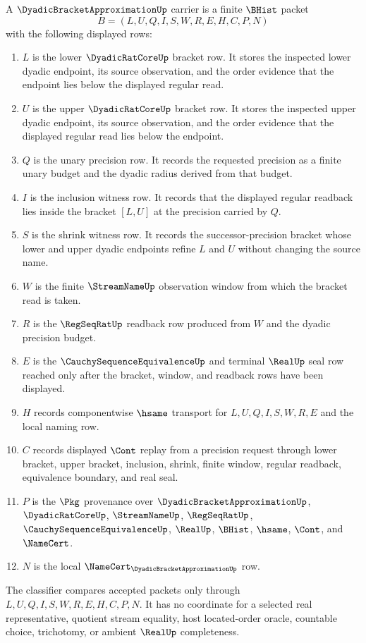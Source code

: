 \begin{definition}
\label{def:dyadic-bracket-approximation-carrier}
A $\DyadicBracketApproximationUp$ carrier is a finite $\BHist$ packet
$$
B=(L,U,Q,I,S,W,R,E,H,C,P,N)
$$
with the following displayed rows:
\begin{enumerate}
\item $L$ is the lower $\DyadicRatCoreUp$ bracket row. It stores the inspected lower dyadic endpoint, its source observation, and the order evidence that the endpoint lies below the displayed regular read.
\item $U$ is the upper $\DyadicRatCoreUp$ bracket row. It stores the inspected upper dyadic endpoint, its source observation, and the order evidence that the displayed regular read lies below the endpoint.
\item $Q$ is the unary precision row. It records the requested precision as a finite unary budget and the dyadic radius derived from that budget.
\item $I$ is the inclusion witness row. It records that the displayed regular readback lies inside the bracket $[L,U]$ at the precision carried by $Q$.
\item $S$ is the shrink witness row. It records the successor-precision bracket whose lower and upper dyadic endpoints refine $L$ and $U$ without changing the source name.
\item $W$ is the finite $\StreamNameUp$ observation window from which the bracket read is taken.
\item $R$ is the $\RegSeqRatUp$ readback row produced from $W$ and the dyadic precision budget.
\item $E$ is the $\CauchySequenceEquivalenceUp$ and terminal $\RealUp$ seal row reached only after the bracket, window, and readback rows have been displayed.
\item $H$ records componentwise $\hsame$ transport for $L,U,Q,I,S,W,R,E$ and the local naming row.
\item $C$ records displayed $\Cont$ replay from a precision request through lower bracket, upper bracket, inclusion, shrink, finite window, regular readback, equivalence boundary, and real seal.
\item $P$ is the $\Pkg$ provenance over $\DyadicBracketApproximationUp$, $\DyadicRatCoreUp$, $\StreamNameUp$, $\RegSeqRatUp$, $\CauchySequenceEquivalenceUp$, $\RealUp$, $\BHist$, $\hsame$, $\Cont$, and $\NameCert$.
\item $N$ is the local $\NameCert_{\DyadicBracketApproximationUp}$ row.
\end{enumerate}
The classifier compares accepted packets only through $L,U,Q,I,S,W,R,E,H,C,P,N$. It has no coordinate for a selected real representative, quotient stream equality, host located-order oracle, countable choice, trichotomy, or ambient $\RealUp$ completeness.
\end{definition}

